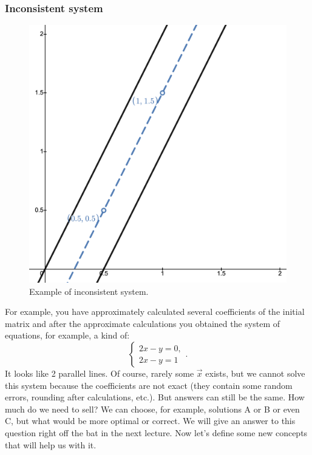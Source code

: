     \subsubsection*{Inconsistent system}
    \begin{figure}
        \includegraphics[height=0.25\columnwidth, width=0.25\columnwidth]{lectures/images/inconsistent_system.png}
        \caption*{\scriptsize{Example of inconsistent system.}}
        \label{fig:inconsistent}
    \end{figure}
    For example, you have approximately calculated several coefficients of the initial matrix and after the approximate calculations you obtained the system of equations, for example, a kind of: 
    $$
        \left\{
            \begin{array}{c}
                2x-y=0,\\
                2x-y=1
            \end{array}.
        \right.  
    $$
    It looks like 2 parallel lines. Of course, rarely some $\vec{x}$ exists, but we cannot solve this system because the coefficients are not exact (they contain some random errors, rounding after calculations, etc.). But answers can still be the same. How much do we need to sell? We can choose, for example, solutions A or B or even C, but what would be more optimal or correct. We will give an answer to this question right off the bat in the next lecture. Now let's define some new concepts that will help us with it.
